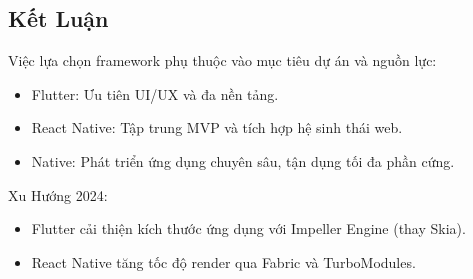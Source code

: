 \subsection{Kết Luận}
\renewcommand{\labelitemi}{--}    

  \hspace*{0.8cm}Việc lựa chọn framework phụ thuộc vào mục tiêu dự án và nguồn lực:
  \setlength{\leftmargini}{1.5cm}
  \begin{itemize}
      \item Flutter: Ưu tiên UI/UX và đa nền tảng.
      \item React Native: Tập trung MVP và tích hợp hệ sinh thái web.
      \item Native: Phát triển ứng dụng chuyên sâu, tận dụng tối đa phần cứng.
  \end{itemize}
\vspace{0.5em}


  \hspace*{0.8cm}Xu Hướng 2024:
  \setlength{\leftmargini}{1.5cm}
  \begin{itemize}
      \item Flutter cải thiện kích thước ứng dụng với Impeller Engine (thay Skia).
      \item React Native tăng tốc độ render qua Fabric và TurboModules.
  \end{itemize}
\vspace{0.5em}